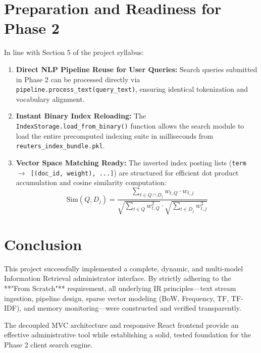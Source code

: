 \documentclass[11pt,a4paper]{article}
\begin{document}
\section{Preparation and Readiness for Phase 2}

In line with Section 5 of the project syllabus:
\begin{enumerate}
    \item \textbf{Direct NLP Pipeline Reuse for User Queries:}
    Search queries submitted in Phase 2 can be processed directly via \texttt{pipeline.process\_text(query\_text)}, ensuring identical tokenization and vocabulary alignment.
    \item \textbf{Instant Binary Index Reloading:}
    The \texttt{IndexStorage.load\_from\_binary()} function allows the search module to load the entire precomputed indexing suite in milliseconds from \texttt{reuters\_index\_bundle.pkl}.
    \item \textbf{Vector Space Matching Ready:}
    The inverted index posting lists (\texttt{term $\to$ [(doc\_id, weight), ...]}) are structured for efficient dot product accumulation and cosine similarity computation:
    \begin{equation}
    \text{Sim}(Q, D_j) = \frac{\sum_{t \in Q \cap D_j} w_{t,Q} \cdot w_{t,j}}{\sqrt{\sum_{t \in Q} w_{t,Q}^2} \cdot \sqrt{\sum_{t \in D_j} w_{t,j}^2}}
    \end{equation}
\end{enumerate}

\section{Conclusion}

This project successfully implemented a complete, dynamic, and multi-model Information Retrieval administrator interface. By strictly adhering to the **"From Scratch"** requirement, all underlying IR principles---text stream ingestion, pipeline design, sparse vector modeling (BoW, Frequency, TF, TF-IDF), and memory monitoring---were constructed and verified transparently. 

The decoupled MVC architecture and responsive React frontend provide an effective administrative tool while establishing a solid, tested foundation for the Phase 2 client search engine.
\end{document}
